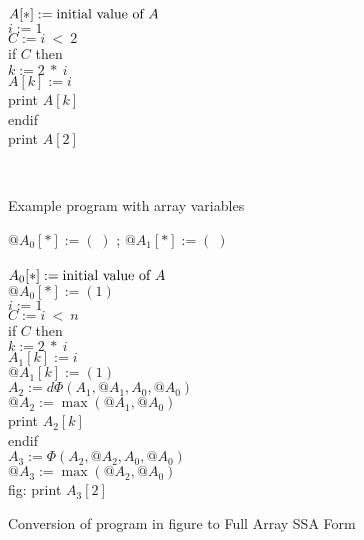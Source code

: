 \begin{figure}%
\begin{center}
\parbox{3.0in}{
\begin{programa}
\Tb $A[*] := \mbox{\rm initial value of $A$}$\\
\Tb$i := 1$ \\
\Tb $C := i\ <\ 2 $\\
\Tb if $C$ then \\
\Tc $k := 2\ *\ i$ \\
\Tc $A[k] := i$\\
\Tc print $A[k]$\\
\Tb endif \\
\Tb print $A[2]$
\end{programa}
}\\
\end{center}
\caption{Example program with array variables}
\label{fig:ssa-acyclic-array}
\end{figure}


\begin{figure}%
\begin{center}
\parbox{3.0in}{
\begin{programa}
\Tb $@A_0[*] := (\;)$ ; $@A_1[*] := (\;)$\\
\\
\Tb $A_0[*] := \mbox{\rm initial value of $A$}$\\
\Tb $@A_0[*] := (1)$\\
\Tb $i := 1$ \\
\Tb $C := i\ <\ n $ \\
\Tb if $C$ then \\
\Tc $k :=  2\ *\ i$ \\
\Tc $A_1[k] := i$\\
\Tc $@A_1[k] := (1)$\\
\Tc $A_2 := d\Phi(A_1, @A_1, A_0, @A_0)$\\
\Tc $@A_2 := \max(@A_1, @A_0)$\\
\Tc print $A_2[k]$\\
\Tb endif \\
\Tb $A_3 := \Phi(A_2, @A_2, A_0, @A_0)$\\
\Tb $@A_3 := \max(@A_2, @A_0)$\\fig:
\Tb print $A_3[2]$ 
\end{programa}
}
\end{center}
\caption{Conversion of program in figure \protect{\ref{fig:ssa-acyclic-array}} to Full Array SSA Form}
\label{fig:full-form}
\end{figure}

